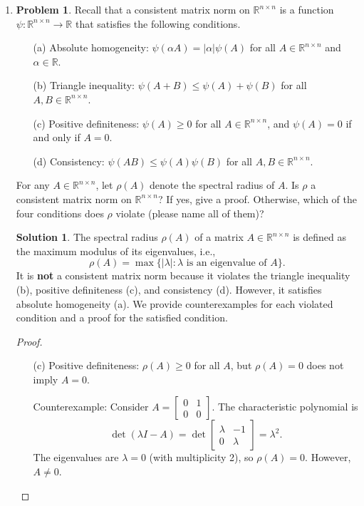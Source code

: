 \documentclass[12pt]{article}
\theoremstyle{definition}
\newtheorem*{solution}{\normalfont\textbf{Solution}}
\newtheorem*{Problem}{\noindent\textbf{Problem}}
\begin{document}
\begin{enumerate}[leftmargin=*]
    \item \begin{Problem}
            Recall that a consistent matrix norm on \( \mathbb{R}^{n \times n} \) is a function \( \psi : \mathbb{R}^{n \times n} \to \mathbb{R} \) that satisfies the following conditions.
            \begin{enumerate}
                \item[(a)] Absolute homogeneity: \( \psi(\alpha A) = |\alpha| \psi(A) \) for all \( A \in \mathbb{R}^{n \times n} \) and \( \alpha \in \mathbb{R} \).
                \item[(b)] Triangle inequality: \( \psi(A + B) \leq \psi(A) + \psi(B) \) for all \( A, B \in \mathbb{R}^{n \times n} \).
                \item[(c)] Positive definiteness: \( \psi(A) \geq 0 \) for all \( A \in \mathbb{R}^{n \times n} \), and \( \psi(A) = 0 \) if and only if \( A = 0 \).
                \item[(d)] Consistency: \( \psi(AB) \leq \psi(A) \psi(B) \) for all \( A, B \in \mathbb{R}^{n \times n} \).
            \end{enumerate}
            For any \( A \in \mathbb{R}^{n \times n} \), let \( \rho(A) \) denote the spectral radius of \( A \). Is \( \rho \) a consistent matrix norm on \( \mathbb{R}^{n \times n} \)? If yes, give a proof. Otherwise, which of the four conditions does \( \rho \) violate (please name all of them)?
        \end{Problem}
        \begin{solution}
            The spectral radius \(\rho(A)\) of a matrix \(A \in \mathbb{R}^{n \times n}\) is defined as the maximum modulus of its eigenvalues, i.e.,
            \[
            \rho(A) = \max \{ |\lambda| : \lambda \text{ is an eigenvalue of } A \}.
            \]
            It is \textbf{not} a consistent matrix norm because it violates the triangle inequality (b), positive definiteness (c), and consistency (d). However, it satisfies absolute homogeneity (a). We provide counterexamples for each violated condition and a proof for the satisfied condition.
            \begin{proof}
                \begin{enumerate}
                    \item[(c)] Positive definiteness: \(\rho(A) \geq 0\) for all \(A\), but \(\rho(A) = 0\) does not imply \(A = 0\).
                    
                    Counterexample: Consider \(A = \begin{bmatrix} 0 & 1 \\ 0 & 0 \end{bmatrix}\). The characteristic polynomial is
                    \[
                    \det(\lambda I - A) = \det\begin{bmatrix} \lambda & -1 \\ 0 & \lambda \end{bmatrix} = \lambda^2.
                    \]
                    The eigenvalues are \(\lambda = 0\) (with multiplicity 2), so \(\rho(A) = 0\). However, \(A \neq 0\).


\end{enumerate}
\end{proof}
\end{solution}
\end{enumerate}
\end{document}
